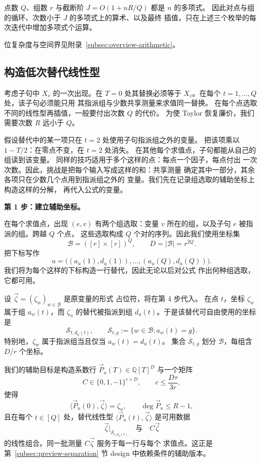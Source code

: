 点数 $Q$、组数 $r$ 与截断阶 $J=O(1+nR/Q)$ 都是 $n$ 的多项式。
因此对点与组的循环、次数小于 $J$ 的多项式上的算术、以及最终
插值，只在上述三个枚举的每次迭代中增加多项式个运算。

位复杂度与空间界见附录~\ref{subsec:overview-arithmetic}。

\subsection{构造低次替代线性型}
\label{subsec:preview-auxiliary}
考虑子句中 $X_v$ 的一次出现。在 $T=0$ 处其替换必须等于
$X_v$。在每个 $t=1,\ldots,Q$ 处，该子句必须能只用
其指派组与少数共享测量来求值同一替换。
在每个点选取不同的线性型再插值，一般要付出次数 $Q$ 的代价。
为使 Taylor 恢复廉价，我们需要次数 $R$ 远小于 $Q$。

假设替代中的某一项只在 $t=2$ 处使用子句指派组之外的变量。
把该项乘以 $1-T/2$：在零点不变，在 $t=2$ 处消失。
在其他每个求值点，子句都能从自己的组读到该变量。
同样的技巧适用于多个这样的点：每点一个因子，每点付出
一次次数。因此，挑战是把每个输入写成这样的和：共享测量
确定其中一部分，其余各项只在少数几个点用到指派组之外的
变量。我们先在记录组选取的辅助坐标上构造这样的分解，
再代入公式的变量。

\medskip\noindent
\textbf{第 1 步：建立辅助坐标。}\par\nobreak
\smallskip\noindent
在每个求值点，出现 $(e,v)$ 有两个组选取：变量 $v$
所在的组，以及子句 $e$ 被指派的组。跨越 $Q$ 个点，
这些选取构成 $Q$ 个对的序列。因此我们使用坐标集
\[
 \mathcal B=([r]\times[r])^Q,\qquad D=|\mathcal B|=r^{2Q}.
\]
把下标写作
\[
 u=\bigl((a_u(1),d_u(1)),\ldots,(a_u(Q),d_u(Q))\bigr).
\]
我们将为每个这样的下标构造一行替代，因此无论以后对公式
作出何种组选取，它都可用。

设 $\vec\zeta=(\zeta_w)_{w\in\mathcal B}$ 是原变量的形式
占位符，将在第 4 步代入。
在点 $t$，坐标 $\zeta_w$ 属于组 $a_w(t)$，而 $\zeta_u$
的替代被指派到组 $d_u(t)$。于是该替代可自由使用的坐标是
\[
 \mathcal S_{t,d_u(t)},\qquad
 \mathcal S_{t,g}:=\{w\in\mathcal B:a_w(t)=g\}.
\]
特别地，$\zeta_w$ 属于指派组当且仅当 $a_w(t)=d_u(t)$。
集合 $\mathcal S_{t,g}$ 划分 $\mathcal B$，每组含 $D/r$
个坐标。

我们的辅助目标是构造系数行 $\vec P_u(T)\in\mathbb Q[T]^D$
与一个矩阵
\[
 C\in\{0,1,-1\}^{c\times D},\qquad c\le\frac{D\tau}{3r},
\]
使得
\[
 \langle\vec P_u(0),\vec\zeta\rangle=\zeta_u,
 \qquad \deg\vec P_u\le R-1,
\]
且在每个 $t\in[Q]$ 处，替代线性型
$\langle\vec P_u(t),\vec\zeta\rangle$ 是可用数据
\begin{equation}\label{eq:overview-auxiliary-requirement}
 \vec\zeta|_{\mathcal S_{t,d_u(t)}}\quad\text{与}\quad C\vec\zeta
\end{equation}
的线性组合。同一批测量 $C\vec\zeta$ 服务于每一行与每个
求值点。这正是第~\ref{subsec:preview-separation} 节 design
中依赖条件的辅助版本。

